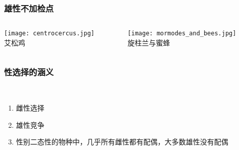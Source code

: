 \documentclass[UTF8,lualatex]{ctexbeamer}
\begin{document}

\begin{frame}
    \frametitle{雄性不加检点}
    \begin{columns}
        \begin{column}{.48\textwidth}
            \begin{center}
                \texttt{[image: centrocercus.jpg]}
                \\
                \small
                艾松鸡
            \end{center}
        \end{column}
        \begin{column}{.48\textwidth}
            \begin{center}
                \texttt{[image: mormodes\_and\_bees.jpg]}
                \\
                \small
                旋柱兰与蜜蜂
            \end{center}
        \end{column}
    \end{columns}
\end{frame}


\begin{frame}
    \frametitle{性选择的涵义}
    \begin{block}{~}
        \begin{enumerate}
            \item 雌性选择
            \item 雄性竞争
            \item 性别二态性的物种中，几乎所有雌性都有配偶，大多数雄性没有配偶
        \end{enumerate}
    \end{block}
\end{frame}
\end{document}
